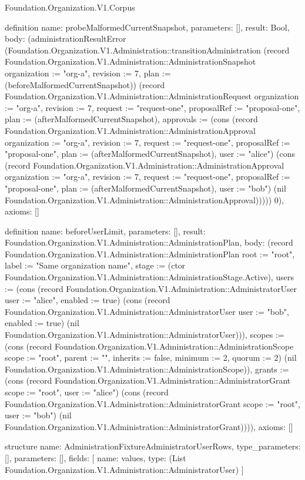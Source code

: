 \begin{lexlean}{Foundation.Organization.V1.Corpus}
\begin{semanticmodule}
definition{
  name: probeMalformedCurrentSnapshot,
  parameters: [],
  result: Bool,
  body: (administrationResultError (Foundation.Organization.V1.Administration::transitionAdministration (record Foundation.Organization.V1.Administration::AdministrationSnapshot {organization := "org-a", revision := 7, plan := (beforeMalformedCurrentSnapshot)}) (record Foundation.Organization.V1.Administration::AdministrationRequest {organization := "org-a", revision := 7, request := "request-one", proposalRef := "proposal-one", plan := (afterMalformedCurrentSnapshot), approvals := (cons (record Foundation.Organization.V1.Administration::AdministrationApproval {organization := "org-a", revision := 7, request := "request-one", proposalRef := "proposal-one", plan := (afterMalformedCurrentSnapshot), user := "alice"}) (cons (record Foundation.Organization.V1.Administration::AdministrationApproval {organization := "org-a", revision := 7, request := "request-one", proposalRef := "proposal-one", plan := (afterMalformedCurrentSnapshot), user := "bob"}) (nil Foundation.Organization.V1.Administration::AdministrationApproval)))})) 0),
  axioms: []
}

definition{
  name: beforeUserLimit,
  parameters: [],
  result: Foundation.Organization.V1.Administration::AdministrationPlan,
  body: (record Foundation.Organization.V1.Administration::AdministrationPlan {root := "root", label := "Same organization name", stage := (ctor Foundation.Organization.V1.Administration::AdministrationStage.Active), users := (cons (record Foundation.Organization.V1.Administration::AdministratorUser {user := "alice", enabled := true}) (cons (record Foundation.Organization.V1.Administration::AdministratorUser {user := "bob", enabled := true}) (nil Foundation.Organization.V1.Administration::AdministratorUser))), scopes := (cons (record Foundation.Organization.V1.Administration::AdministrationScope {scope := "root", parent := "", inherits := false, minimum := 2, quorum := 2}) (nil Foundation.Organization.V1.Administration::AdministrationScope)), grants := (cons (record Foundation.Organization.V1.Administration::AdministratorGrant {scope := "root", user := "alice"}) (cons (record Foundation.Organization.V1.Administration::AdministratorGrant {scope := "root", user := "bob"}) (nil Foundation.Organization.V1.Administration::AdministratorGrant)))}),
  axioms: []
}

structure{
  name: AdministrationFixtureAdministratorUserRows,
  type_parameters: [],
  parameters: [],
  fields: [
    {name: values, type: (List Foundation.Organization.V1.Administration::AdministratorUser)}
  ]
}


\end{semanticmodule}
\end{lexlean}
